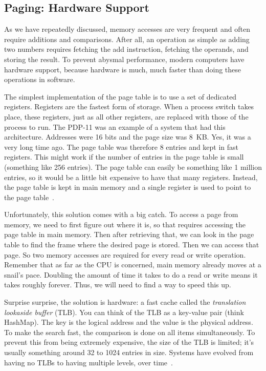 \subsection*{Paging: Hardware Support}
As we have repeatedly discussed, memory accesses are very frequent and often require additions and comparisons. After all, an operation as simple as adding two numbers requires fetching the add instruction, fetching the operands, and storing the result. To prevent abysmal performance, modern computers have hardware support, because hardware is much, much faster than doing these operations in software.

The simplest implementation of the page table is to use a set of dedicated registers. Registers are the fastest form of storage. When a process switch takes place, these registers, just as all other registers, are replaced with those of the process to run. The PDP-11 was an example of a system that had this architecture. Addresses were 16 bits and the page size was 8~KB. Yes, it was a very long time ago. The page table was therefore 8 entries and kept in fast registers. This might work if the number of entries in the page table is small (something like 256 entries). The page table can easily be something like 1 million entries, so it would be a little bit expensive to have that many registers. Instead, the page table is kept in main memory and a single register is used to point to the page table~\cite{osc}.

Unfortunately, this solution comes with a big catch. To access a page from memory, we need to first figure out where it is, so that requires accessing the page table in main memory. Then after retrieving that, we can look in the page table to find the frame where the desired page is stored. Then we can access that page. So two memory accesses are required for every read or write operation. Remember that as far as the CPU is concerned, main memory already moves at a snail's pace. Doubling the amount of time it takes to do a read or write means it takes roughly forever. Thus, we will need to find a way to speed this up.

Surprise surprise, the solution is hardware: a fast cache called the \textit{translation lookaside buffer} (TLB). You can think of the TLB as a key-value pair (think HashMap). The key is the logical address and the value is the physical address. To make the search fast, the comparison is done on all items simultaneously. To prevent this from being extremely expensive, the size of the TLB is limited; it's usually something around 32 to 1024 entries in size. Systems have evolved from having no TLBs to having multiple levels, over time~\cite{osc}.

